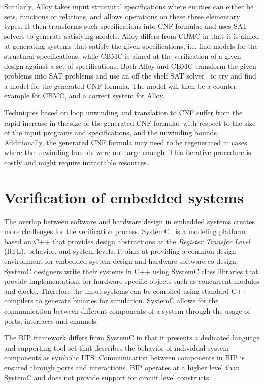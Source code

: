 Similarly, Alloy takes input structural specifications where entities can either be 
sets, functions or relations, and allows operations on these three elementary types. 
It then transforms such specifications into CNF formulae and uses SAT solvers to generate
satisfying models. Alloy differs from CBMC in that it
is aimed at generating systems that satisfy the given specifications, i.e. find models for the 
structural specifications, while CBMC is aimed at the verification of a given design against
a set of specifications. Both Alloy and CBMC transform the given problems into SAT 
problems and use an off the shelf SAT solver~\cite{goldberg2007berkmin, marques1999grasp, sorensson2005minisat} 
to try and find a model for the generated CNF formula. The model will then be a counter example
for CBMC, and a correct system for Alloy. 

Techniques based on loop unwinding and translation to CNF suffer from the rapid increase 
in the size of the generated CNF formulae with respect to the size of the input programs and
specifications, and the unwinding bounds. Additionally, the generated CNF formula may need to be
regenerated in cases where the unwinding bounds were not large enough. This iterative procedure
is costly and might require intractable resources. 

\section{Verification of embedded systems}
The overlap between software and hardware design in embedded systems creates more challenges 
for the verification process. SystemC~\cite{systemc} is a modeling platform based on C++ that provides
design abstractions at the {\em Register Transfer Level} (RTL), behavior, and system levels. 
It aims at providing a common design environment for embedded system design and hardware-software
co-design. SystemC designers write their systems in C++ using SystemC class libraries that 
provide implementations for hardware specific objects such as concurrent modules and clocks.
Therefore the input systems can be compiled using standard C++ compilers to generate binaries
for simulation. SystemC allows for the communication between different components of a system
through the usage of ports, interfaces and channels.  

The BIP framework differs from SystemC in that it presents a dedicated language and supporting
tool-set that describes the behavior of individual system components as symbolic LTS. 
Communication between components in BIP is ensured through ports and interactions.   
BIP operates at a higher level than SystemC and does not provide support for circuit level 
constructs.

